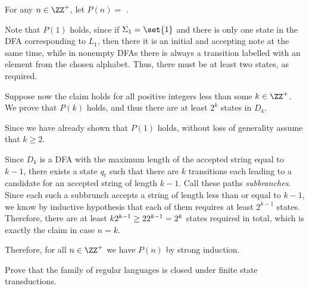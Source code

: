 \documentclass[11pt]{scrartcl}
\begin{document}
\begin{soln}
  \hfill

  For any $n\in\ZZ^+$, let $P(n)=$ .

  Note that $P(1)$ holds, since if $\Sigma_1 = \set{1}$ and there is
  only one state in the DFA corresponding to $L_1$, then there it is
  an initial and accepting note at the same time, while in nonempty
  DFAs there is always a transition labelled with an element from the
  chosen alphabet. Thus, there must be at least two states, as required.

  Suppose now the claim holds for all positive integers less than some
  $k\in\ZZ^{+}$. We prove that $P(k)$ holds, and thus there are at
  least $2^k$ states in $D_k$.

  Since we have already shown that $P(1)$ holds, without loss of
  generality assume that $k\geq 2$.

  Since $D_k$ is a DFA with the maximum length of the accepted string
  equal to $k-1$, there exists a state $q_t$ such that there are $k$
  transitions each leading to a candidate for an accepted string of
  length $k-1$. Call these paths \textit{subbranches}. Since each such
  a subbrunch accepts a string of length less than or equal to $k-1$,
  we know by inductive hypothesis that each of them requires at least
  $2^{k-1}$ states. Therefore, there are at least
  $k\*2^{k-1} \geq 2\*2^{k-1}=2^k$ states required in total, which is
  exactly the claim in case $n=k$.

  Therefore, for all $n\in\ZZ^+$ we have $P(n)$ by strong induction.

\end{soln}

\begin{problem*}
  \hfill

Prove that the family of regular languages is closed under finite state transductions.
\end{problem*}
\end{document}

